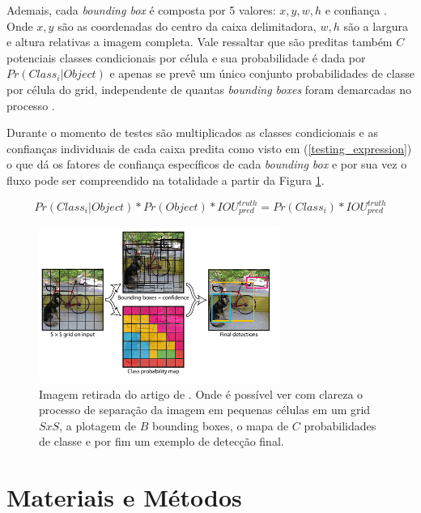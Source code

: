 \documentclass[12pt]{article}
\begin{document}
Ademais, cada {\it bounding box} é composta por 5 valores: $x, y, w, h$ e confiança \cite{Redmon2015}. Onde $x, y$ são as coordenadas do centro da caixa delimitadora, $w, h$ são a largura e altura relativas a imagem completa. Vale ressaltar que são preditas também $C$ potenciais classes condicionais por célula e sua probabilidade é dada por $Pr(Class_i | Object)$ e apenas se prevê um único conjunto probabilidades de classe por célula do grid, independente de quantas {\it bounding boxes} foram demarcadas no processo \cite{Redmon2015}.

Durante o momento de testes são multiplicados as classes condicionais e as confianças individuais de cada caixa predita como visto em (\ref{testing_expression}) o que dá os fatores de confiança específicos de cada {\it bounding box} e por sua vez o fluxo pode ser compreendido na totalidade a partir da Figura \ref{fig:yolo}.

\begin{equation}
  \label{testing_expression}
  Pr(Class_i|Object) * Pr(Object) * IOU^{truth}_{pred} = Pr(Class_i) * IOU^{truth}_{pred}
\end{equation}

\begin{figure}[ht]
  \centering
  \includegraphics[width=0.7\textwidth]{images/yolo.png}
  \caption{Imagem retirada do artigo de . Onde é possível ver com clareza o processo de separação da imagem em pequenas células em um grid $S x S$, a plotagem de $B$  bounding boxes, o mapa de $C$ probabilidades de classe e por fim um exemplo de detecção final.}
  \label{fig:yolo}
\end{figure}

\FloatBarrier

\section{Materiais e Métodos}
\end{document}
